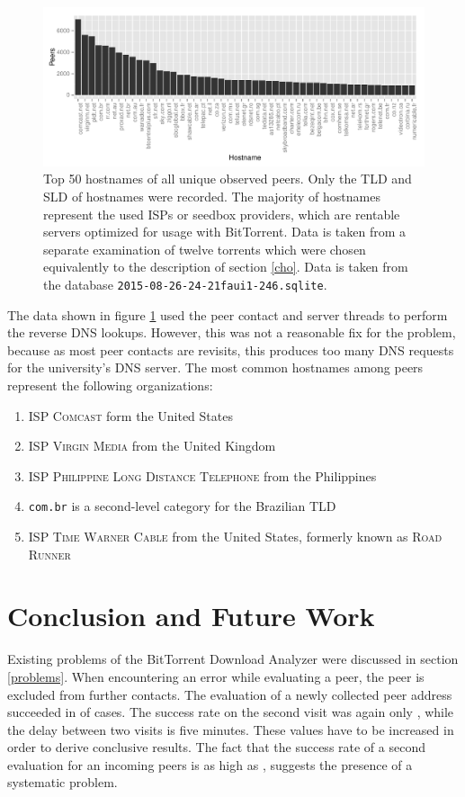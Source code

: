 \documentclass[10pt, a4paper, twoside=false, headsepline]{scrbook}
\renewcommand{\_}{\origunderscore\allowbreak}
\begin{document}
\begin{figure}
\centering
\includegraphics[width=\textwidth]{../result/2015-08-26_11-24-21_faui1-246_hostnames}
\caption[Most observed ISPs by hostname]{Top 50 hostnames of all unique observed peers. Only the TLD and SLD of hostnames were recorded. The majority of hostnames represent the used ISPs or seedbox providers, which are rentable servers optimized for usage with BitTorrent. Data is taken from a separate examination of twelve torrents which were chosen equivalently to the description of section \ref{cho}. Data is taken from the database \texttt{2015-08-26\_11-24-21\_faui1-246.sqlite}.}
\label{hostname}
\end{figure}

The data shown in figure \ref{hostname} used the peer contact and server threads to perform the reverse DNS lookups. However, this was not a reasonable fix for the problem, because as most peer contacts are revisits, this produces too many DNS requests for the university's DNS server. The most common hostnames among peers represent the following organizations:
\begin{enumerate}
\item ISP \textsc{Comcast} form the United States
\item ISP \textsc{Virgin Media} from the United Kingdom
\item ISP \textsc{Philippine Long Distance Telephone} from the Philippines
\item \texttt{com.br} is a second-level category for the Brazilian TLD
\item ISP \textsc{Time Warner Cable} from the United States, formerly known as \textsc{Road Runner}
\end{enumerate}

\chapter{Conclusion and Future Work}
\label{conc}
Existing problems of the BitTorrent Download Analyzer were discussed in section \ref{problems}. When encountering an error while evaluating a peer, the peer is excluded from further contacts. The evaluation of a newly collected peer address succeeded in  of cases. The success rate on the second visit was again only , while the delay between two visits is five minutes. These values have to be increased in order to derive conclusive results. The fact that the success rate of a second evaluation for an incoming peers is as high as , suggests the presence of a systematic problem.
\end{document}
